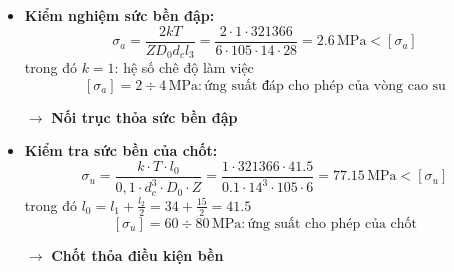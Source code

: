 \begin{itemize}
    \item \textbf{Kiểm nghiệm sức bền đập:}
    \[
    \sigma_a = \frac{2kT}{ZD_0 d_c l_3} = \frac{2 \cdot 1 \cdot 321366}{6 \cdot 105 \cdot 14 \cdot 28} = 2.6 \, \text{MPa} < [\sigma_a]
    \]
    trong đó \( k = 1 \): hệ số chê độ làm việc
    \[
    [\sigma_a] = 2 \div 4 \, \text{MPa} : \text{ứng suất đáp cho phép của vòng cao su}
    \]

    \item[\(\rightarrow\)] \textbf{Nối trục thỏa sức bền đập}

    \item \textbf{Kiểm tra sức bền của chốt:}
    \[
    \sigma_u = \frac{k \cdot T \cdot l_0}{0,1 \cdot d^3_c \cdot D_0 \cdot Z} = \frac{1 \cdot 321366 \cdot 41.5}{0.1 \cdot 14^3 \cdot 105 \cdot 6} = 77.15 \, \text{MPa} < [\sigma_u]
    \]
    trong đó \( l_0 = l_1 + \frac{l_2}{2} = 34 + \frac{15}{2} = 41.5 \)
    \[
    [\sigma_u] = 60 \div 80 \, \text{MPa} : \text{ứng suất cho phép của chốt}
    \]
    \item[\(\rightarrow\)] \textbf{Chốt thỏa điều kiện bền}
\end{itemize}